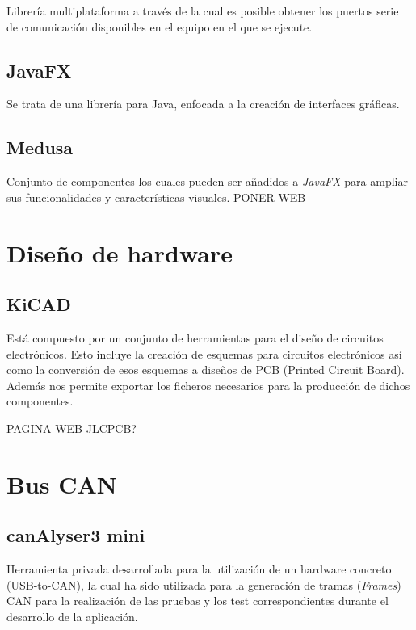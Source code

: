 Librería multiplataforma a través de la cual es posible obtener los puertos serie de comunicación disponibles en el equipo en el que se ejecute.

\subsection{JavaFX}\label{javafx}
Se trata de una librería para Java, enfocada a la creación de interfaces gráficas.

\subsection{Medusa}\label{medusa}

Conjunto de componentes los cuales pueden ser añadidos a \emph{JavaFX} para ampliar sus funcionalidades y características visuales.
PONER WEB

\section{Diseño de hardware}\label{diseño_de_hardware}

\subsection{KiCAD}\label{kicad}

Está compuesto por un conjunto de herramientas para el diseño de circuitos electrónicos. Esto incluye la creación de esquemas para circuitos electrónicos así como la conversión de esos esquemas a diseños de PCB (Printed Circuit Board). Además nos permite exportar los ficheros necesarios para la producción de dichos componentes.

PAGINA WEB JLCPCB?

\section{Bus CAN}\label{bus_can}

\subsection{canAlyser3 mini}\label{canalyser3_mini}

Herramienta privada desarrollada para la utilización de un hardware concreto (USB-to-CAN), la cual ha sido utilizada para la generación de tramas (\emph{Frames}) CAN para la realización de las pruebas y los test correspondientes durante el desarrollo de la aplicación.

